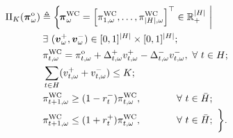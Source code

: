 \begin{align}
	& \hspace{-0.40cm} \Pi_{K}(\boldsymbol{\pi}^{\text{o}}_{\omega}) \triangleq \bigg\{ \hspace{-0.40cm} && \boldsymbol{\pi}^{\text{WC}}_{\omega} = \Big[ \pi^{\text{WC}}_{1, \omega}, \dots, \pi^{\text{WC}}_{|H|, \omega} \Big]^{\top} \in \mathbb{R}^{|H|}_{+} ~ \bigg| \label{PUS1} \\
	& && \hspace{-0.60cm} \exists ~ (\boldsymbol{v}_{\omega}^{+}, \boldsymbol{v}_{\omega}^{-}) \in [0, 1]^{|H|} \times [0, 1]^{|H|}; \label {PUS2} \\
	& &&\hspace{-0.60cm} \pi^{\text{WC}}_{t, \omega} = \pi^{\text{o}}_{t, \omega} + \Delta_{t, \omega}^{+} v_{t,\omega}^{+} - \Delta_{t, \omega}^{-} v_{t,\omega}^{-}, ~ \forall ~ t \in H; \label{PUS3} \\
	& &&\hspace{-0.60cm} \sum_{t \in H} (v_{t,\omega}^{+} + v_{t,\omega}^{-}) \leq K; && \label{PUS4} \\
	& &&\hspace{-0.60cm} \pi^{\text{WC}}_{t+1,\omega} \geq (1 - r_{t}^{-}) \pi^{\text{WC}}_{t,\omega}, && \hspace{-2.20cm} \forall ~ t \in \bar{H}; \label{PUS5} \\
	& &&\hspace{-0.60cm} \pi^{\text{WC}}_{t+1,\omega} \leq (1 + r_{t}^{+}) \pi^{\text{WC}}_{t,\omega}, && \hspace{-2.20cm} \forall ~ t \in \bar{H}; ~ \bigg\}. \label{PUS6}
\end{align}

